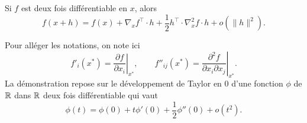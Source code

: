 \begin{proposition} \label{prop:taylorOrdre2}
  Si $f$ est deux fois différentiable en $x$, alors
  $$
  f(x+h) = f(x) + \nabla_x f^\top \cdot h + \frac12 h^\top \cdot \nabla^2_x f \cdot h + o(\|h\|^2).
  $$
\end{proposition}

\proof
  Pour alléger les notations, on note ici
  $$
  f'_i(x^*) = \left. \frac{\partial f}{\partial x_i}\right|_{x^*}, \qquad 
  f''_{ij}(x^*) = \left. \frac{\partial^2 f}{\partial x_i \partial x_j}\right|_{x^*}.
  $$
  La démonstration repose sur le développement de Taylor en 0 d'une fonction $\phi$ de $\mathbb{R}$ dans $\mathbb{R}$ deux fois différentiable qui vaut
  \begin{equation} \label{eq:taylor2phi}
  \phi(t) = \phi(0) + t \phi'(0) + \frac12 \phi''(0) + o(t^2).
  \end{equation}

